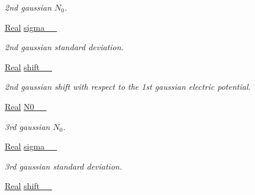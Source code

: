 \begin{DoxyCompactItemize}
\begin{DoxyCompactList}\small\item\em 2nd gaussian $ N_0 $. \end{DoxyCompactList}\item 
\hypertarget{classParamList_a3ead6e4cc08dc0320e0b98c29e6d9337}{\hyperlink{typedefs_8h_a060b837c3b4486ee35317744156f3da2}{Real} \hyperlink{classParamList_a3ead6e4cc08dc0320e0b98c29e6d9337}{sigma\-\_\-\_\-}}\label{classParamList_a3ead6e4cc08dc0320e0b98c29e6d9337}

\begin{DoxyCompactList}\small\item\em 2nd gaussian standard deviation. \end{DoxyCompactList}\item 
\hypertarget{classParamList_a0f5e1e6350aeec57d0b7dacba5d86230}{\hyperlink{typedefs_8h_a060b837c3b4486ee35317744156f3da2}{Real} \hyperlink{classParamList_a0f5e1e6350aeec57d0b7dacba5d86230}{shift\-\_\-\_\-}}\label{classParamList_a0f5e1e6350aeec57d0b7dacba5d86230}

\begin{DoxyCompactList}\small\item\em 2nd gaussian shift with respect to the 1st gaussian electric potential. \end{DoxyCompactList}\item 
\hypertarget{classParamList_a180b65203622e6c324a5f78bd16ac4d7}{\hyperlink{typedefs_8h_a060b837c3b4486ee35317744156f3da2}{Real} \hyperlink{classParamList_a180b65203622e6c324a5f78bd16ac4d7}{N0\-\_\-\_\-}}\label{classParamList_a180b65203622e6c324a5f78bd16ac4d7}

\begin{DoxyCompactList}\small\item\em 3rd gaussian $ N_0 $. \end{DoxyCompactList}\item 
\hypertarget{classParamList_ad0e6dd2c004d045b411bf0f0bb0544e2}{\hyperlink{typedefs_8h_a060b837c3b4486ee35317744156f3da2}{Real} \hyperlink{classParamList_ad0e6dd2c004d045b411bf0f0bb0544e2}{sigma\-\_\-\_\-}}\label{classParamList_ad0e6dd2c004d045b411bf0f0bb0544e2}

\begin{DoxyCompactList}\small\item\em 3rd gaussian standard deviation. \end{DoxyCompactList}\item 
\hypertarget{classParamList_a84789797624123c5835390017f5520fe}{\hyperlink{typedefs_8h_a060b837c3b4486ee35317744156f3da2}{Real} \hyperlink{classParamList_a84789797624123c5835390017f5520fe}{shift\-\_\-\_\-}}\label{classParamList_a84789797624123c5835390017f5520fe}


\end{DoxyCompactItemize}
